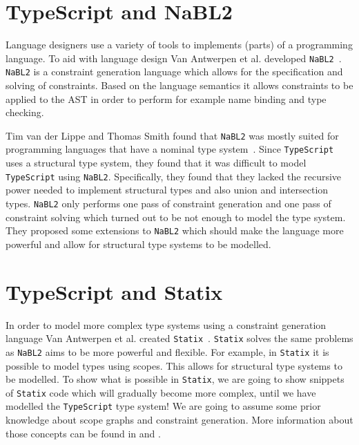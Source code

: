 \documentclass{article}
\newcommand{\ttt}[1]{\texttt{#1}}
\begin{document}
\section{TypeScript and NaBL2}
Language designers use a variety of tools to implements (parts) of a programming language.
To aid with language design Van Antwerpen et al. developed \ttt{NaBL2}~\cite{nabl2}.
\ttt{NaBL2} is a constraint generation language which allows for the specification and solving of constraints.
Based on the language semantics it allows constraints to be applied to the AST in order to perform for example name binding and type checking.

Tim van der Lippe and Thomas Smith found that \ttt{NaBL2} was mostly suited for programming languages that have a nominal type system~\cite{MetaTypeScript}.
Since \ttt{TypeScript} uses a structural type system, they found that it was difficult to model \ttt{TypeScript} using \ttt{NaBL2}.
Specifically, they found that they lacked the recursive power needed to implement structural types and also union and intersection types.
\ttt{NaBL2} only performs one pass of constraint generation and one pass of constraint solving which turned out to be not enough to model the type system.
They proposed some extensions to \ttt{NaBL2} which should make the language more powerful and allow for structural type systems to be modelled.

\section{TypeScript and Statix}
In order to model more complex type systems using a constraint generation language Van Antwerpen et al. created \ttt{Statix}~\cite{Statix}.
\ttt{Statix} solves the same problems as \ttt{NaBL2} aims to be more powerful and flexible.
For example, in \ttt{Statix} it is possible to model types using scopes.
This allows for structural type systems to be modelled.
To show what is possible in \ttt{Statix}, we are going to show snippets of \ttt{Statix} code which will gradually become more complex, until we have modelled the \ttt{TypeScript} type system!
We are going to assume some prior knowledge about scope graphs and constraint generation.
More information about those concepts can be found in \cite{nabl2} and \cite{Statix}.

\end{document}
